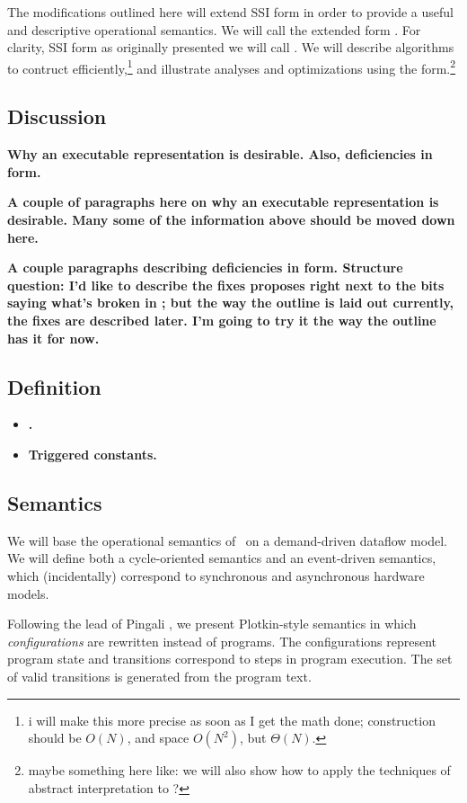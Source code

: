 \documentclass[12pt,notitlepage]{article}
\begin{document}
The modifications outlined here will extend SSI form in order to
provide a useful and descriptive operational semantics.  We will call
the extended form \ssiplus.  For clarity, SSI form as originally
presented we will call \ssizero.  We will describe algorithms to
contruct \ssiplus{} efficiently,\footnote{i will make this more precise
as soon as I get the math done; construction should be $O(N)$, and space
$O(N^2)$, but $\Theta(N)$.} and illustrate analyses and
optimizations using the form.\footnote{maybe something here like: we
will also show how to apply the techniques of abstract interpretation
to \ssiplus?}

\subsection{Discussion}
\textbf{Why an executable representation is desirable.  Also,
deficiencies in \ssizero{} form.}

\textbf{A couple of paragraphs here on why an executable
representation is desirable.  Many some of the information above
should be moved down here.}

\textbf{A couple paragraphs describing deficiencies in \ssizero{} form.
Structure question: I'd like to describe the fixes \ssiplus{} proposes
right next to the bits saying what's broken in \ssizero{}; but the way
the outline is laid out currently, the fixes are described later.  I'm
going to try it the way the outline has it for now.}

\subsection{Definition}
\begin{itemize}
\item \textbf{.}
\item \textbf{Triggered constants.}
\end{itemize}

\subsection{Semantics}\label{sec:semantics}
We will base the operational semantics of \ssiplus\ on a demand-driven
dataflow model.  We will define both a cycle-oriented semantics and an
event-driven semantics, which (incidentally) correspond to synchronous
and asynchronous hardware models.

Following the lead of Pingali \cite{pingali90:dfg}, we present Plotkin-style
semantics \cite{plotkin81:opsem} in which \emph{configurations} are
rewritten instead of programs.  The configurations represent program
state and transitions correspond to steps in program execution.  The
set of valid transitions is generated from the program text.
\end{document}
